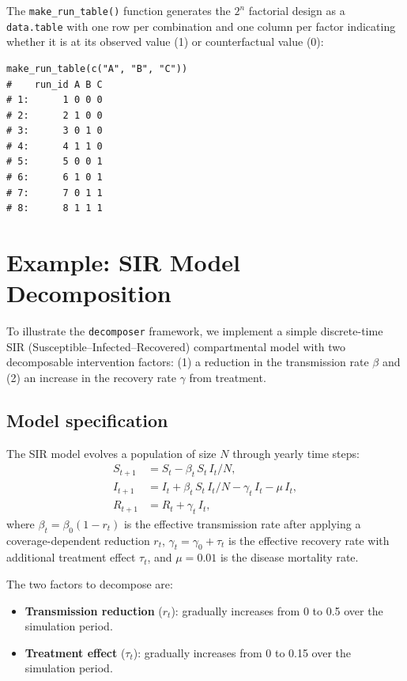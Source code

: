 \documentclass[11pt]{article}
\newcommand{\pkg}[1]{\texttt{#1}}
\newcommand{\code}[1]{\texttt{#1}}
\begin{document}
The \code{make\_run\_table()} function generates the $2^n$ factorial
design as a \code{data.table} with one row per combination and one
column per factor indicating whether it is at its observed value (1)
or counterfactual value (0):

\begin{lstlisting}[caption={Run table for $n=3$ factors.},
                   label=lst:runtable]
make_run_table(c("A", "B", "C"))
#    run_id A B C
# 1:      1 0 0 0
# 2:      2 1 0 0
# 3:      3 0 1 0
# 4:      4 1 1 0
# 5:      5 0 0 1
# 6:      6 1 0 1
# 7:      7 0 1 1
# 8:      8 1 1 1
\end{lstlisting}


\section{Example: SIR Model Decomposition}
\label{sec:example}

To illustrate the \pkg{decomposer} framework, we implement a simple
discrete-time SIR (Susceptible--Infected--Recovered) compartmental model
with two decomposable intervention factors: (1) a reduction in the
transmission rate $\beta$ and (2) an increase in the recovery rate
$\gamma$ from treatment.

\subsection{Model specification}

The SIR model evolves a population of size $N$ through yearly time
steps:
\begin{align}
  S_{t+1} &= S_t - \beta_t \, S_t \, I_t / N, \label{eq:sir-s} \\
  I_{t+1} &= I_t + \beta_t \, S_t \, I_t / N
             - \gamma_t \, I_t - \mu \, I_t, \label{eq:sir-i} \\
  R_{t+1} &= R_t + \gamma_t \, I_t, \label{eq:sir-r}
\end{align}
where $\beta_t = \beta_0 (1 - r_t)$ is the effective transmission rate
after applying a coverage-dependent reduction $r_t$,
$\gamma_t = \gamma_0 + \tau_t$ is the effective recovery rate with
additional treatment effect $\tau_t$, and $\mu = 0.01$ is the disease
mortality rate.

The two factors to decompose are:
\begin{itemize}
  \item \textbf{Transmission reduction} ($r_t$): gradually increases
    from 0 to 0.5 over the simulation period.
  \item \textbf{Treatment effect} ($\tau_t$): gradually increases from
    0 to 0.15 over the simulation period.
\end{itemize}
\end{document}
